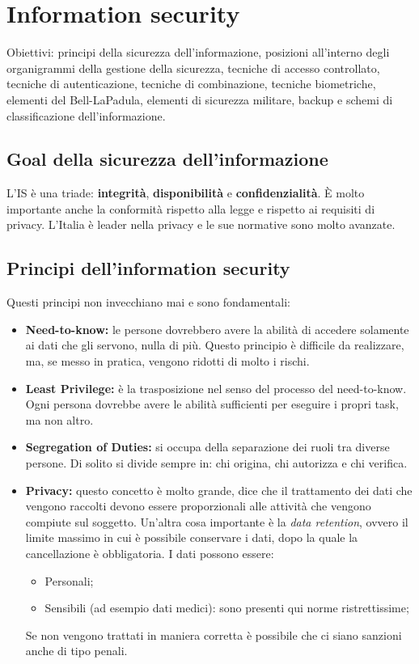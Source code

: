 \chapter{Information security}

Obiettivi: principi della sicurezza dell'informazione, posizioni all'interno 
degli organigrammi della gestione della sicurezza, tecniche di accesso 
controllato, tecniche di autenticazione, tecniche di combinazione, 
tecniche biometriche, elementi del Bell-LaPadula, elementi di sicurezza militare, 
backup e schemi di classificazione dell'informazione.


\section{Goal della sicurezza dell'informazione}

L'IS è una triade: \textbf{integrità}, \textbf{disponibilità} e 
\textbf{confidenzialità}. È molto importante anche la conformità rispetto alla 
legge e rispetto ai requisiti di privacy. L'Italia è leader nella privacy e le 
sue normative sono molto avanzate.


\section{Principi dell'information security}

Questi principi non invecchiano mai e sono fondamentali:
\begin{itemize}
  \item \textbf{Need-to-know:} le persone dovrebbero avere la abilità di accedere solamente ai dati che gli
  servono, nulla di più. Questo principio è difficile da realizzare, ma,
  se messo in pratica, vengono ridotti di molto i rischi.
  \item \textbf{Least Privilege:} è la trasposizione nel senso del processo del need-to-know. Ogni persona
  dovrebbe avere le abilità sufficienti per eseguire i propri task, ma non
  altro.
  \item \textbf{Segregation of Duties:} si occupa della separazione dei ruoli tra diverse persone. Di solito si
  divide sempre in: chi origina, chi autorizza e chi verifica.
  \item \textbf{Privacy:} questo concetto è molto grande, dice che il trattamento dei dati che
  vengono raccolti devono essere proporzionali alle attività che vengono
  compiute sul soggetto. Un'altra cosa importante è la \textit{data retention},
  ovvero il limite massimo in cui è possibile conservare i dati, dopo la quale
  la cancellazione è obbligatoria. I dati possono essere:
  \begin{itemize}
    \item Personali;
    \item Sensibili (ad esempio dati medici): sono presenti qui norme
    ristrettissime;
  \end{itemize}
  Se non vengono trattati in maniera corretta è possibile che ci siano sanzioni
  anche di tipo penali.
\end{itemize}

